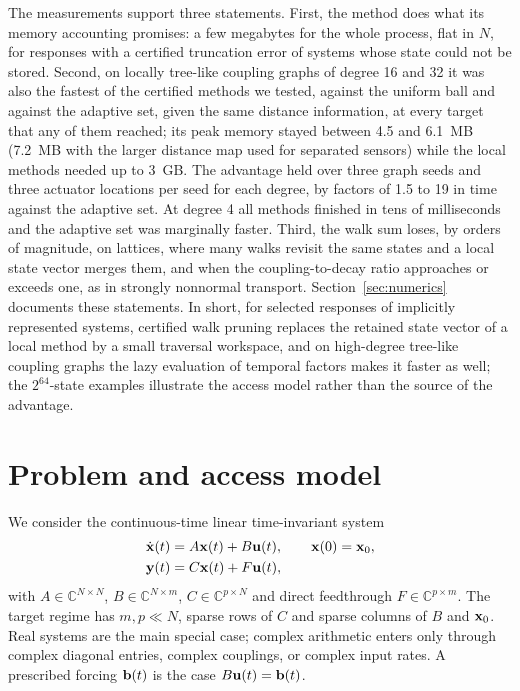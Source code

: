 \documentclass[aps,pra,superscriptaddress,floatfix,longbibliography,twocolumn]{revtex4-2}
\newcommand{\bx}{{\bf x}}
\newcommand{\bu}{{\bf u}}
\newcommand{\by}{{\bf y}}
\newcommand{\bb}{{\bf b}}
\begin{document}
The measurements support three statements. First, the method does what its memory accounting promises: a few megabytes for the whole process, flat in $N$, for responses with a certified truncation error of systems whose state could not be stored. Second, on locally tree-like coupling graphs of degree 16 and 32 it was also the fastest of the certified methods we tested, against the uniform ball and against the adaptive set, given the same distance information, at every target that any of them reached; its peak memory stayed between 4.5 and 6.1~MB (7.2~MB with the larger distance map used for separated sensors) while the local methods needed up to 3~GB. The advantage held over three graph seeds and three actuator locations per seed for each degree, by factors of 1.5 to 19 in time against the adaptive set. At degree 4 all methods finished in tens of milliseconds and the adaptive set was marginally faster. Third, the walk sum loses, by orders of magnitude, on lattices, where many walks revisit the same states and a local state vector merges them, and when the coupling-to-decay ratio approaches or exceeds one, as in strongly nonnormal transport. Section~\ref{sec:numerics} documents these statements. In short, for selected responses of implicitly represented systems, certified walk pruning replaces the retained state vector of a local method by a small traversal workspace, and on high-degree tree-like coupling graphs the lazy evaluation of temporal factors makes it faster as well; the $2^{64}$-state examples illustrate the access model rather than the source of the advantage.
\section{Problem and access model}\label{sec:problem}

We consider the continuous-time linear time-invariant system
\begin{equation}\label{eq:lti}
\begin{aligned}
\dot\bx(t)&=A\bx(t)+B\bu(t),\qquad \bx(0)=\bx_0,\\
\by(t)&=C\bx(t)+F\bu(t),
\end{aligned}
\end{equation}
with $A\in\mathbb{C}^{N\times N}$, $B\in\mathbb{C}^{N\times m}$, $C\in\mathbb{C}^{p\times N}$ and direct feedthrough $F\in\mathbb{C}^{p\times m}$. The target regime has $m,p\ll N$, sparse rows of $C$ and sparse columns of $B$ and $\bx_0$. Real systems are the main special case; complex arithmetic enters only through complex diagonal entries, complex couplings, or complex input rates. A prescribed forcing $\bb(t)$ is the case $B\bu(t)=\bb(t)$.
\end{document}
